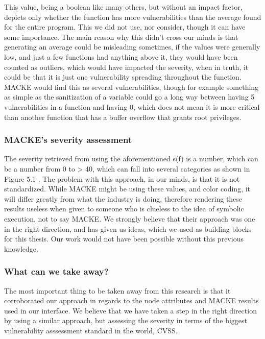 This value, being a boolean like many others, but without an impact factor, depicts only whether the function has more vulnerabilities than the average found for the entire program. This we did not use, nor consider, though it can have some importance. The main reason why this didn't cross our minds is that generating an average could be misleading sometimes, if the values were generally low, and just a few functions had anything above it, they would have been counted as outliers, which would have impacted the severity, when in truth, it could be that it is just one vulnerability spreading throughout the function. MACKE would find this as several vulnerabilities, though for example something as simple as the sanitization of a variable could go a long way between having 5 vulnerabilities in a function and having 0, which does not mean it is more critical than another function that has a buffer overflow that grants root privileges.

\subsubsection{MACKE's severity assessment}

The severity retrieved from using the aforementioned s(f) is a number, which can be a number from 0 to > 40, which can fall into several categories as shown in Figure 5.1 \parencite{ognawala}. The problem with this approach, in our minds, is that it is not standardized. While MACKE might be using these values, and color coding, it will differ greatly from what the industry is doing, therefore rendering these results useless when given to someone who is clueless to the idea of symbolic execution, not to say MACKE. We strongly believe that their approach was one in the right direction, and has given us ideas, which we used as building blocks for this thesis. Our work would not have been possible without this previous knowledge.

\subsubsection{What can we take away?}

The most important thing to be taken away from this research is that it corroborated our approach in regards to the node attributes and MACKE results used in our interface. We believe that we have taken a step in the right direction by using a similar approach, but assessing the severity in terms of the biggest vulnerability asssessment standard in the world, CVSS\parencite{cvss3}.

